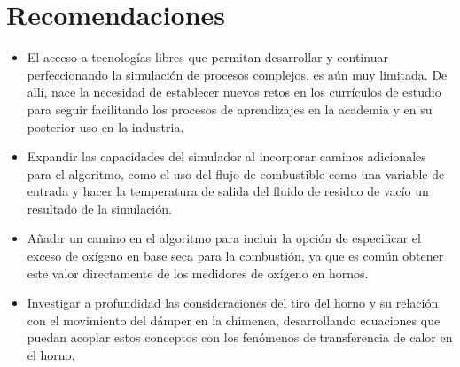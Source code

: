 \chapter*{Recomendaciones}

\begin{itemize}
    \item El acceso a tecnologías libres que permitan desarrollar y continuar perfeccionando la simulación de procesos complejos, es aún muy limitada. De allí, nace la necesidad de establecer nuevos retos en los currículos de estudio para seguir facilitando los procesos de aprendizajes en la academia y en su posterior uso en la industria.
    
    \item Expandir las capacidades del simulador al incorporar caminos adicionales para el algoritmo, como el uso del flujo de combustible como una variable de entrada y hacer la temperatura de salida del fluido de residuo de vacío un resultado de la simulación.
    
    \item Añadir un camino en el algoritmo para incluir la opción de especificar el exceso de oxígeno en base seca para la combustión, ya que es común obtener este valor directamente de los medidores de oxígeno en hornos.
    
    \item Investigar a profundidad las consideraciones del tiro del horno y su relación con el movimiento del dámper en la chimenea, desarrollando ecuaciones que puedan acoplar estos conceptos con los fenómenos de transferencia de calor en el horno.
\end{itemize}
